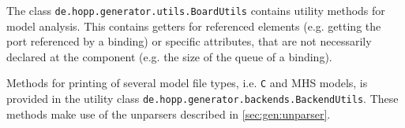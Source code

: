 \documentclass{report}
\begin{document}
The class \texttt{de.hopp.generator.utils.BoardUtils} contains utility methods for model analysis. This contains getters for referenced elements (e.g. getting the port referenced by a binding) or specific attributes, that are not necessarily declared at the component (e.g. the size of the queue of a binding).

Methods for printing of several model file types, i.e. \texttt{C} and MHS models, is provided in the utility class \texttt{de.hopp.generator.backends.BackendUtils}. These methods make use of the unparsers described in \ref{sec:gen:unparser}.


\newpage
\pagestyle{empty}


\end{document}
